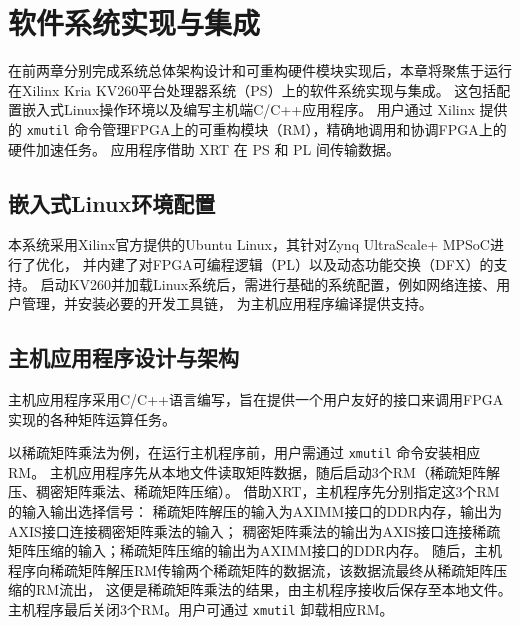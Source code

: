 \chapter{软件系统实现与集成}

在前两章分别完成系统总体架构设计和可重构硬件模块实现后，本章将聚焦于运行在Xilinx Kria KV260平台处理器系统（PS）上的软件系统实现与集成。
这包括配置嵌入式Linux操作环境以及编写主机端C/C++应用程序。
用户通过 Xilinx 提供的 \verb|xmutil| 命令管理FPGA上的可重构模块（RM），精确地调用和协调FPGA上的硬件加速任务。
应用程序借助 XRT 在 PS 和 PL 间传输数据。

\section{嵌入式Linux环境配置}

本系统采用Xilinx官方提供的Ubuntu Linux，其针对Zynq UltraScale+ MPSoC进行了优化，
并内建了对FPGA可编程逻辑（PL）以及动态功能交换（DFX）的支持。
启动KV260并加载Linux系统后，需进行基础的系统配置，例如网络连接、用户管理，并安装必要的开发工具链，
为主机应用程序编译提供支持。

\section{主机应用程序设计与架构}

主机应用程序采用C/C++语言编写，旨在提供一个用户友好的接口来调用FPGA实现的各种矩阵运算任务。

以稀疏矩阵乘法为例，在运行主机程序前，用户需通过 \verb|xmutil| 命令安装相应RM。
主机应用程序先从本地文件读取矩阵数据，随后启动3个RM（稀疏矩阵解压、稠密矩阵乘法、稀疏矩阵压缩）。
借助XRT，主机程序先分别指定这3个RM的输入输出选择信号：
稀疏矩阵解压的输入为AXIMM接口的DDR内存，输出为AXIS接口连接稠密矩阵乘法的输入；
稠密矩阵乘法的输出为AXIS接口连接稀疏矩阵压缩的输入；稀疏矩阵压缩的输出为AXIMM接口的DDR内存。
随后，主机程序向稀疏矩阵解压RM传输两个稀疏矩阵的数据流，该数据流最终从稀疏矩阵压缩的RM流出，
这便是稀疏矩阵乘法的结果，由主机程序接收后保存至本地文件。
主机程序最后关闭3个RM。用户可通过 \verb|xmutil| 卸载相应RM。
